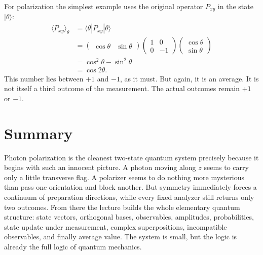 For polarization the simplest example uses the original operator \(P_{xy}\) in the state \(|\theta\rangle\):
\begin{align}
\langle P_{xy}\rangle_\theta
&=
\langle \theta|P_{xy}|\theta\rangle \\
&=
\begin{pmatrix}
\cos\theta & \sin\theta
\end{pmatrix}
\begin{pmatrix}
1&0\\
0&-1
\end{pmatrix}
\begin{pmatrix}
\cos\theta\\
\sin\theta
\end{pmatrix} \\
&=
\cos^2\theta-\sin^2\theta \\
&=
\cos 2\theta.
\end{align}
This number lies between \(+1\) and \(-1\), as it must. But again, it is an average. It is not itself a third outcome of the measurement. The actual outcomes remain \(+1\) or \(-1\).

\section{Summary}

Photon polarization is the cleanest two-state quantum system precisely because it begins with such an innocent picture. A photon moving along \(z\) seems to carry only a little transverse flag. A polarizer seems to do nothing more mysterious than pass one orientation and block another. But symmetry immediately forces a continuum of preparation directions, while every fixed analyzer still returns only two outcomes. From there the lecture builds the whole elementary quantum structure: state vectors, orthogonal bases, observables, amplitudes, probabilities, state update under measurement, complex superpositions, incompatible observables, and finally average value. The system is small, but the logic is already the full logic of quantum mechanics.